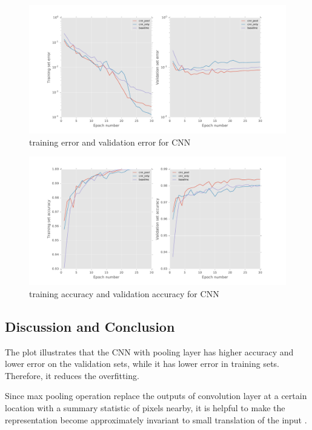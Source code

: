\documentclass[11pt]{article}
\begin{document}
\begin{figure}[htp]
\centering 
  \includegraphics[width=1\textwidth]{cnn_error.pdf}
  \caption{training error and validation error for CNN}
  \label{fg:cnn_error}
\end{figure}

\begin{figure}[htp]
\centering 
  \includegraphics[width=1\textwidth]{cnn_acc.pdf}
  \caption{training accuracy and validation accuracy for CNN}
  \label{fg:cnn_acc}
\end{figure}

\newpage
\subsection{Discussion and Conclusion}
The plot illustrates that the CNN with pooling layer has higher accuracy and lower error on the validation sets, while it has lower error in training sets. Therefore, it reduces the overfitting. 

Since max pooling operation replace the outputs of convolution layer at a certain location with a summary statistic of pixels nearby, it is helpful to make the representation become approximately invariant to small translation of the input \cite{Goodfellow-et-al-2016-Book}. 
\end{document}
